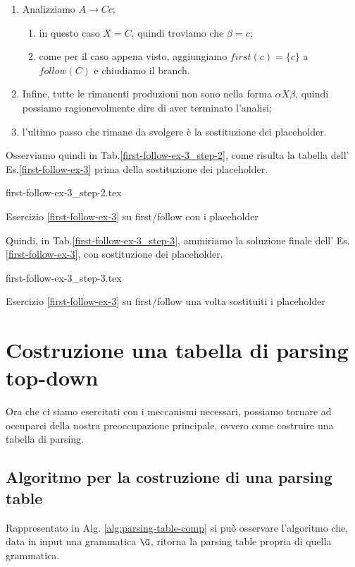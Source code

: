\documentclass[class=book, crop=false, oneside, 12pt]{standalone}
\begin{document}
\begin{enumerate}
\begin{enumerate}
    \end{enumerate}
    \item Analizziamo \(A \to Cc\);
    \begin{enumerate}
        \item in questo caso \(X = C\), quindi troviamo che \(\beta = c\);
        \item come per il caso appena visto, aggiungiamo \(first(c)=\{c\}\) a \(follow(C)\) e chiudiamo il branch.
    \end{enumerate}
    \item Infine, tutte le rimanenti produzioni non sono nella forma \(\alpha X \beta\), quindi possiamo ragionevolmente dire di aver terminato l’analisi;
    \item l'ultimo passo che rimane da svolgere è la sostituzione dei placeholder.
\end{enumerate}
Osserviamo quindi in Tab.\ref{first-follow-ex-3_step-2}, come risulta la tabella dell' Es.\ref{first-follow-ex-3} prima della sostituzione dei placeholder.
\begin{table}[H]
	\centering
	{first-follow-ex-3_step-2.tex}
    \caption{Esercizio \ref{first-follow-ex-3} su first/follow con i placeholder}
    \label{first-follow-ex-3_step-2}
\end{table}
Quindi, in Tab.\ref{first-follow-ex-3_step-3}, ammiriamo la soluzione finale dell' Es.\ref{first-follow-ex-3}, con sostituzione dei placeholder.
\begin{table}[H]
	\centering
	{first-follow-ex-3_step-3.tex}
    \caption{Esercizio \ref{first-follow-ex-3} su first/follow una volta sostituiti i placeholder}
    \label{first-follow-ex-3_step-3}
\end{table}

\section{Costruzione una tabella di parsing top-down}
Ora che ci siamo esercitati con i meccanismi necessari, possiamo tornare ad occuparci della nostra preoccupazione principale, ovvero come costruire una tabella di parsing.

\subsection{Algoritmo per la costruzione di una parsing table}
Rappresentato in Alg. \ref{alg:parsing-table-comp} si può osservare l'algoritmo che, data in input una grammatica \(\G\), ritorna la parsing table propria di quella grammatica. 
\end{document}
